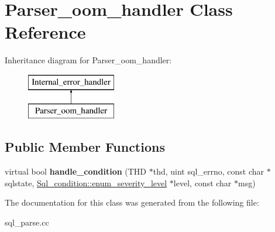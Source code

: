 \hypertarget{classParser__oom__handler}{}\section{Parser\+\_\+oom\+\_\+handler Class Reference}
\label{classParser__oom__handler}
Inheritance diagram for Parser\+\_\+oom\+\_\+handler\+:\begin{figure}[H]
\begin{center}
\leavevmode
\includegraphics[height=2.000000cm]{classParser__oom__handler}
\end{center}
\end{figure}
\subsection*{Public Member Functions}
\begin{DoxyCompactItemize}
\item 
\mbox{\label{classParser__oom__handler_ad176fe433cdefa4da554e82ed5f99761}} 
virtual bool {\bfseries handle\+\_\+condition} (T\+HD $\ast$thd, uint sql\+\_\+errno, const char $\ast$sqlstate, \mbox{\hyperlink{classSql__condition_ab0602581e19cddb609bfe10c44be4e83}{Sql\+\_\+condition\+::enum\+\_\+severity\+\_\+level}} $\ast$level, const char $\ast$msg)
\end{DoxyCompactItemize}


The documentation for this class was generated from the following file\+:\begin{DoxyCompactItemize}
\item 
sql\+\_\+parse.\+cc\end{DoxyCompactItemize}
